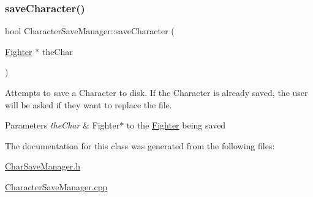 \subsubsection{\texorpdfstring{save\+Character()}{saveCharacter()}}
{\footnotesize\ttfamily bool Character\+Save\+Manager\+::save\+Character (\begin{DoxyParamCaption}\item[{\hyperlink{class_fighter}{Fighter} $\ast$}]{the\+Char }\end{DoxyParamCaption})\hspace{0.3cm}{\ttfamily [static]}}

Attempts to save a Character to disk. If the Character is already saved, the user will be asked if they want to replace the file. 
\begin{DoxyParams}{Parameters}
{\em the\+Char} & Fighter$\ast$ to the \hyperlink{class_fighter}{Fighter} being saved \\
\hline
\end{DoxyParams}


The documentation for this class was generated from the following files\+:\begin{DoxyCompactItemize}
\item 
\hyperlink{_char_save_manager_8h}{Char\+Save\+Manager.\+h}\item 
\hyperlink{_character_save_manager_8cpp}{Character\+Save\+Manager.\+cpp}\end{DoxyCompactItemize}
